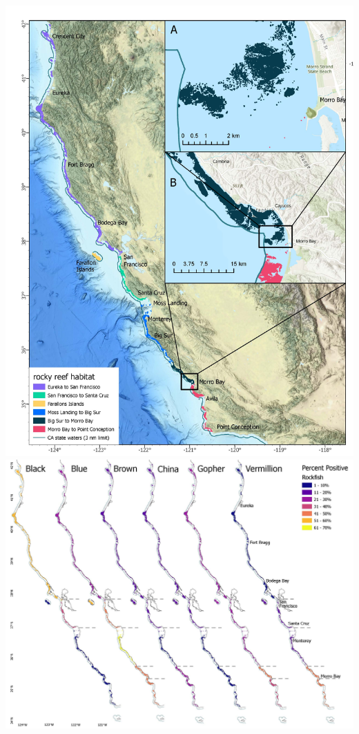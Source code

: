 \documentclass[
  authoryear,
  preprint,
  3p]{elsarticle}
\begin{document}
\includegraphics{figures/map.jpg}
\includegraphics{figures/percentpositives_map.jpg}
\end{document}
